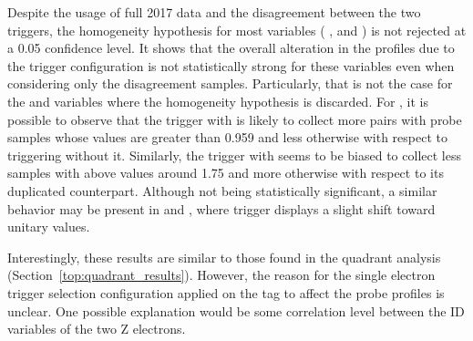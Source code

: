 Despite the usage of full 2017 data and the disagreement between the two
triggers, the homogeneity hypothesis for most variables (\rphi{} \fI{},
\eratio{} and \weta{}) is not rejected at a 0.05 confidence level. It shows that
the overall alteration in the profiles due to the trigger configuration is not
statistically strong for these variables even when considering only the
disagreement samples. Particularly, that is not the case for the \reta{} and
\rhad{} variables where the homogeneity hypothesis is discarded. For \reta{}, it
is possible to observe that the trigger with \rnn{} is likely to collect
more \tnp{} pairs with probe samples whose \reta{} values are greater than 0.959
and less otherwise with respect to triggering without it. Similarly, the trigger
with \rnn{} seems to be biased to collect less samples with \rhad{} above
values around \SI{1.75}{\textperthousand} and more otherwise with respect to its
duplicated counterpart. Although not being statistically significant, a similar
behavior may be present in \eratio{} and \rphi{}, where \rnn{} trigger displays
a slight shift toward unitary values.

Interestingly, these results are similar to those found in the quadrant analysis
(Section~\ref{top:quadrant_results}).  However, the reason for the single
electron trigger selection configuration applied on the tag to affect the probe
profiles is unclear. One possible explanation would be some correlation level
between the ID variables of the two Z electrons.

